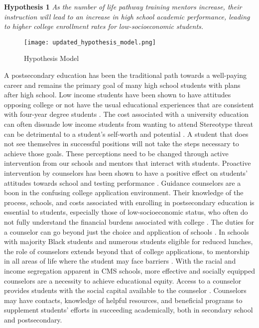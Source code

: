 \textbf{Hypothesis 1} \textit{As the number of life pathway training mentors increase, their instruction will lead to an increase in high school academic performance, leading to higher college enrollment rates for low-socioeconomic students.}

\begin{figure}
    \caption{Hypothesis Model}
    \texttt{[image: updated\_hypothesis\_model.png]}
    \label{fig3}
\end{figure}

A postsecondary education has been the traditional path towards a well-paying career and remains the primary goal of many high school students with plans after high school. 
Low income students have been shown to have attitudes opposing college or not have the usual educational experiences that are consistent with four-year degree students \parencite[][]{king1996}. 
The cost associated with a university education can often dissuade low income students from wanting to attend \parencite[][]{king1996}
Stereotype threat can be detrimental to a student's self-worth and potential \parencite[][]{croizet1998}.
A student that does not see themselves in successful positions will not take the steps necessary to achieve those goals. 
These perceptions need to be changed through active intervention from our schools and mentors that interact with students. 
Proactive intervention by counselors has been shown to have a positive effect on students' attitudes towards school  and testing performance \parencite[][]{lee1993}.
Guidance counselors are a boon in the confusing college application environment. 
Their knowledge of the process, schools, and costs associated with enrolling in postsecondary education is essential to students, especially those of low-socioeconomic status, who often do not fully understand the financial burdens associated with college \parencite[][]{castleman2014intensive,deslonde2018high}. 
The duties for a counselor can go beyond just the choice and application of schools \parencite[][]{deslonde2018high}.  
In schools with majority Black students and numerous students eligible for reduced lunches, the role of counselors extends beyond that of college applications, to mentorship in all areas of life where the student may face barriers \parencite[][]{farmer2006}.
With the racial and income segregation apparent in CMS schools, more effective and socially equipped counselors are a necessity to achieve educational equity. 
Access to a counselor provides students with the social capital available to the counselor \parencite{tang2019high}. 
Counselors may have contacts, knowledge of helpful resources, and beneficial programs to supplement students' efforts in succeeding academically, both in secondary school and postsecondary. 


